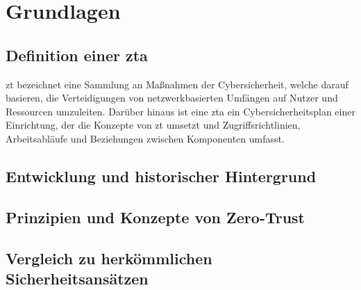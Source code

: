\newpage


\section{Grundlagen}\label{sec:grundlagen}
\subsection[Definition einer Zero-Trust-Architektur]{Definition einer \ac{zta}}\label{subsec:definition-einer-zta}
\ac{zt} bezeichnet eine Sammlung an Maßnahmen der Cybersicherheit, welche darauf basieren, die Verteidigungen von netzwerkbasierten Umfängen auf Nutzer und Ressourcen umzuleiten\autocite[\vglf][]{NIST:800207}.
Darüber hinaus ist eine \ac{zta} ein Cybersicherheitsplan einer Einrichtung, der die Konzepte von \ac{zt} umsetzt und Zugriffsrichtlinien, Arbeitsabläufe und Beziehungen zwischen Komponenten umfasst.\autocite[\vglf][]{NIST:800207}

\subsection{Entwicklung und historischer Hintergrund}\label{subsec:entwicklung-und-historischer-hintergrund}

\subsection{Prinzipien und Konzepte von Zero-Trust}\label{subsec:prinzipien-und-konzepte-von-zero-trust}

\subsection{Vergleich zu herkömmlichen Sicherheitsansätzen}\label{subsec:vergleich-zu-herkommlichen-sicherheitsansatzen}

